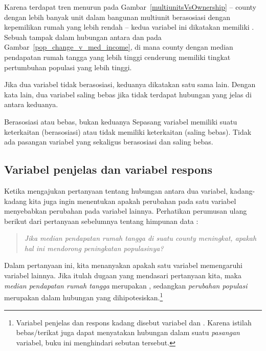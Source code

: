 Karena terdapat tren menurun pada
Gambar~\ref{multiunitsVsOwnership} --
county dengan lebih banyak unit dalam bangunan multiunit
berasosiasi dengan kepemilikan rumah yang lebih rendah --
kedua variabel ini dikatakan memiliki
.
Sebuah  tampak dalam hubungan antara
dan 
pada Gambar~\ref{pop_change_v_med_income},
di mana county dengan median pendapatan rumah tangga yang lebih tinggi
cenderung memiliki tingkat pertumbuhan populasi yang lebih tinggi.

Jika dua variabel tidak berasosiasi,
keduanya dikatakan  satu sama lain.
Dengan kata lain, dua variabel saling bebas jika tidak terdapat
hubungan yang jelas di antara keduanya.

\begin{onebox}{Berasosiasi atau bebas, bukan keduanya}
Sepasang variabel memiliki suatu keterkaitan (berasosiasi) atau tidak memiliki keterkaitan (saling bebas). Tidak ada pasangan variabel yang sekaligus berasosiasi dan saling bebas.
\end{onebox}


\D{\newpage}

\subsection{Variabel penjelas dan variabel respons}
\label{explanatoryAndResponse}

Ketika mengajukan pertanyaan tentang hubungan antara dua variabel,
kadang-kadang kita juga ingin menentukan apakah perubahan pada satu
variabel menyebabkan perubahan pada variabel lainnya.
Perhatikan perumusan ulang berikut dari pertanyaan sebelumnya
tentang himpunan data :
\begin{quote}\em
  Jika median pendapatan rumah tangga di suatu county meningkat,
  apakah hal ini mendorong peningkatan populasinya?
\end{quote}
Dalam pertanyaan ini, kita menanyakan apakah satu variabel
memengaruhi variabel lainnya.
Jika itulah dugaan yang mendasari pertanyaan kita,
maka \emph{median pendapatan rumah tangga} merupakan
, sedangkan
\emph{perubahan populasi} merupakan
dalam hubungan yang dihipotesiskan.\footnote{Variabel penjelas dan respons
  kadang disebut variabel  dan
  . Karena istilah bebas/terikat juga dapat
  menyatakan hubungan dalam suatu \emph{pasangan} variabel, buku ini
  menghindari sebutan tersebut.}

